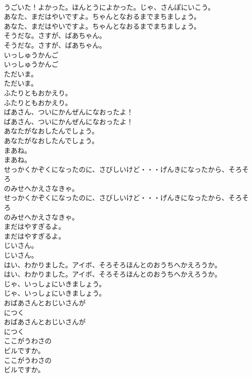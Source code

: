 \documentclass[8pt]{extreport}
\begin{document}
\begin{CJK}{UTF8}{min}
\\	うごいた！よかった。ほんとうによかった。じゃ、さんぽにいこう。
\\	あなた、まだはやいですよ。ちゃんとなおるまでまちましょう。
\\	あなた、まだはやいですよ。ちゃんとなおるまでまちましょう。
\\	そうだな。さすが、ばあちゃん。
\\	そうだな。さすが、ばあちゃん。
\\	いっしゅうかんご
\\	いっしゅうかんご
\\	ただいま。
\\	ただいま。
\\	ふたりともおかえり。
\\	ふたりともおかえり。
\\	ばあさん、ついにかんぜんになおったよ！
\\	ばあさん、ついにかんぜんになおったよ！
\\	あなたがなおしたんでしょう。
\\	あなたがなおしたんでしょう。
\\	まあね。
\\	まあね。
\\	せっかくかぞくになったのに、さびしいけど・・・げんきになったから、そろそろ
\\	のみせへかえさなきゃ。
\\	せっかくかぞくになったのに、さびしいけど・・・げんきになったから、そろそろ
\\	のみせへかえさなきゃ。
\\	まだはやすぎるよ。
\\	まだはやすぎるよ。
\\	じいさん。
\\	じいさん。
\\	はい、わかりました。アイボ、そろそろほんとのおうちへかえろうか。
\\	はい、わかりました。アイボ、そろそろほんとのおうちへかえろうか。
\\	じゃ、いっしょにいきましょう。
\\	じゃ、いっしょにいきましょう。
\\	おばあさんとおじいさんが
\\	につく
\\	おばあさんとおじいさんが
\\	につく
\\	ここがうわさの
\\	ビルですか。
\\	ここがうわさの
\\	ビルですか。

\end{CJK}
\end{document}
